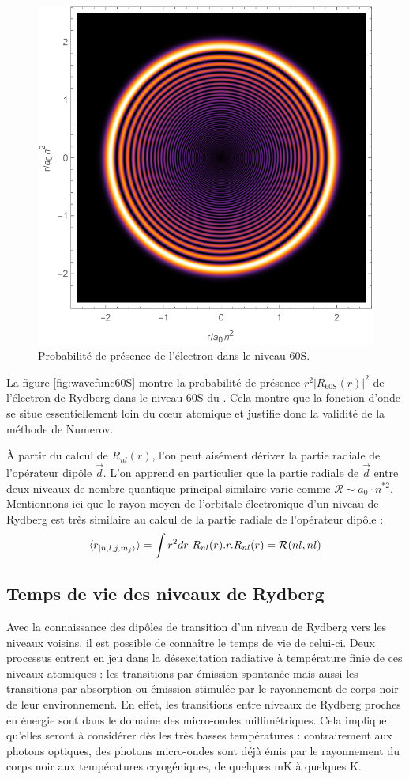 \begin{figure}[!h]
	\centering
	\includegraphics[width=0.6\linewidth]{figures/WaveFunc_60S_}
	\caption[Fonction d'onde du niveau 60S]{Probabilité de présence de l'électron dans le niveau $60$S.}
	\label{fig:wavefunc60S}
\end{figure}

La figure \eqref{fig:wavefunc60S} montre la probabilité de présence $r^2|R_{60\mathrm{S}}(r)|^2$ de l'électron de Rydberg dans le niveau $60$S du .
Cela montre que la fonction d'onde se situe essentiellement loin du c\oe ur atomique et justifie donc la validité de la méthode de Numerov.

\`A partir du calcul de $R_{nl}(r)$, l'on peut aisément dériver la partie radiale de l'opérateur dipôle $\vec{d}$.
L'on apprend en particulier que la partie radiale de $\vec{d}$ entre deux niveaux de nombre quantique principal similaire varie comme $\mathcal{R} \sim a_0\cdot n^{*2}$.
Mentionnons ici que le rayon moyen de l'orbitale électronique d'un niveau de Rydberg est très similaire au calcul de la partie radiale de l'opérateur dipôle :
\begin{equation}\label{eq:orbital_size}
\braket{r_{\ket{n,l,j,m_j}}} = \int r^2dr~R_{nl}(r).r.R_{nl}(r) = \mathcal{R}(nl,nl)
\end{equation}

	\subsection{Temps de vie des niveaux de Rydberg}
\noindent Avec la connaissance des dipôles de transition d'un niveau de Rydberg vers les niveaux voisins, 	il est possible de connaître le temps de vie de celui-ci.
Deux processus entrent en jeu dans la désexcitation radiative à température finie de ces niveaux atomiques :
les transitions par émission spontanée mais aussi les transitions par absorption ou émission stimulée par le rayonnement de corps noir de leur environnement.
En effet, les transitions entre niveaux de Rydberg proches en énergie sont dans le domaine des micro-ondes millimétriques.
Cela implique qu'elles seront à considérer dès les très basses températures : contrairement aux photons optiques, des photons micro-ondes sont déjà émis par le rayonnement du corps noir aux températures cryogéniques, de quelques \si{\milli\kelvin} à quelques \si{\kelvin}.

